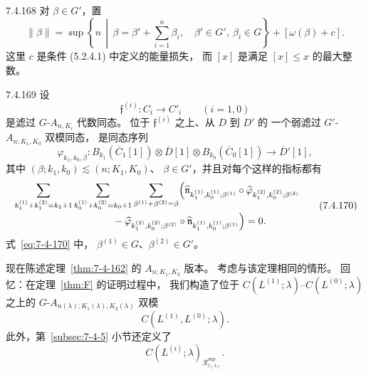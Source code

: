 \begin{definition}{7.4.168}\label{def:7-4-168}
对 $\beta\in G'$，置
\[
\|\beta\|
=
\sup\left\{
n\,\middle|\,
\beta=\beta'+\sum_{i=1}^{n}\beta_i,
\quad
\beta'\in G',\ \beta_i\in G
\right\}
+[\omega(\beta)+c].
\]
这里 $c$ 是条件 (5.2.4.1) 中定义的能量损失，
而 $[x]$ 是满足 $[x]\leq x$ 的最大整数。
\end{definition}

\begin{definition}{7.4.169}\label{def:7-4-169}
设
\[
\mathfrak f^{(i)}\colon C_i\longrightarrow C'_i
\qquad(i=1,0)
\]
是滤过 $G$-$A_{n,K_i}$ 代数同态。
位于 $\mathfrak f^{(i)}$ 之上、从 $D$ 到 $D'$ 的
一个弱滤过 $G'$-$A_{n;K_1,K_0}$ 双模同态，
是同态序列
\[
\varphi_{k_1,k_0,\beta}\colon
B_{k_1}(\overline C_1[1])
\otimes\overline D[1]
\otimes B_{k_0}(\overline C_0[1])
\longrightarrow\overline D'[1],
\]
其中
$(\beta;k_1,k_0)\lesssim(n;K_1,K_0)$、
$\beta\in G'$，并且对每个这样的指标都有
\begin{equation}
\begin{aligned}
&\sum_{k_1^{(1)}+k_1^{(2)}=k_1+1}
\sum_{k_0^{(1)}+k_0^{(2)}=k_0+1}
\sum_{\beta^{(1)}+\beta^{(2)}=\beta}
\Bigl(
\widehat{\mathfrak n}_{
k_1^{(1)},k_0^{(1)};\beta^{(1)}}
\circ
\widehat\varphi_{
k_1^{(2)},k_0^{(2)};\beta^{(2)}}
\notag\\[-.2em]
&\hspace{10em}
-
\widehat\varphi_{
k_1^{(2)},k_0^{(2)};\beta^{(2)}}
\circ
\widehat{\mathfrak n}_{
k_1^{(1)},k_0^{(1)};\beta^{(1)}}
\Bigr)
=0.
\end{aligned}
\tag{7.4.170}\label{eq:7-4-170}
\end{equation}
式~\eqref{eq:7-4-170} 中，
$\beta^{(1)}\in G$、$\beta^{(2)}\in G'$。
\end{definition}

现在陈述定理~\ref{thm:7-4-162} 的
$A_{n;K_1,K_2}$ 版本。
考虑与该定理相同的情形。
回忆：在定理~\ref{thm:F} 的证明过程中，
我们构造了位于
$C(L^{(1)};\lambda)$--$C(L^{(0)};\lambda)$
之上的 $G$-$A_{n(\lambda);K_1(\lambda),K_2(\lambda)}$ 双模
\[
C(L^{(1)},L^{(0)};\lambda).
\]
此外，第~\ref{subsec:7-4-5} 小节还定义了
\[
C(L^{(i)};\lambda)_
{\mathcal R^{\mathrm{sup}}_{l(\lambda)}}.
\]

